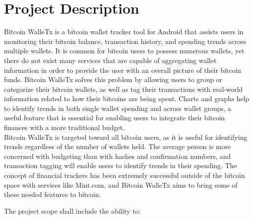 \documentclass[12pt]{article}
\begin{document}
  \section{Project Description}
  \begin{adjustwidth}{1.5em}{0pt}

  \normalsize{Bitcoin WalleTx is a bitcoin wallet tracker tool for Android that assists users in monitoring their bitcoin balance, transaction history, and spending trends across multiple 
  wallets. It is common for bitcoin users to possess numerous wallets, yet there do not exist many services that are capable of aggregating wallet information in order to provide the user 
  with an overall picture of their bitcoin funds. Bitcoin WalleTx solves this problem by allowing users to group or categorize their bitcoin wallets, as well as tag their transactions 
  with real-world information related to how their bitcoins are being spent. Charts and graphs help to identify trends in both single wallet spending and across wallet groups, 
  a useful feature that is essential for enabling users to integrate their bitcoin finances with a more traditional budget.}\\
  
  \normalsize{Bitcoin WalleTx is targeted toward all bitcoin users, as it is useful for identifying trends regardless of the number of wallets held. The average person is more concerned with budgeting than with hashes and confirmation numbers, and transaction
  tagging will enable users to identify trends in their spending. The concept of financial trackers has been extremely successful outside of the bitcoin space with services like
  Mint.com, and Bitcoin WalleTx aims to bring some of these needed features to bitcoin.}\\
  \end{adjustwidth}

  \normalsize{The project scope shall include the ability to:}\\ 
  
\end{document}
